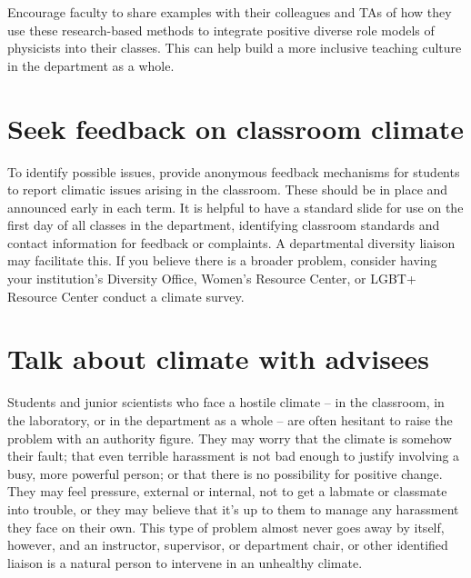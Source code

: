 Encourage faculty to share examples with their colleagues and TAs of how they use these research-based methods to integrate positive diverse role models of physicists into their classes. This can help build a more inclusive teaching culture in the department as a whole.

\section {Seek feedback on classroom climate}
\label{climate-feedback}
To identify possible issues, provide anonymous feedback mechanisms for students to report climatic issues arising in the classroom. These should be in place and announced early in each term. It is helpful to have a standard slide for use on the first day of all classes in the department, identifying classroom standards and contact information for feedback or complaints. A departmental diversity liaison may facilitate this. If you believe there is a broader problem, consider having your institution's Diversity Office, Women's Resource Center, or LGBT+ Resource Center conduct a climate survey.

\section {Talk about climate with advisees}
\label{talk-advisees}
Students and junior scientists who face a hostile climate -- in the classroom, in the laboratory, or in the department as a whole -- are often hesitant to raise the problem with an authority figure. They may worry that the climate is somehow their fault; that even terrible harassment is not bad enough to justify involving a busy, more powerful person; or that there is no possibility for positive change. They may feel pressure, external or internal, not to get a labmate or classmate into trouble, or they may believe that it's up to them to manage any harassment they face on their own. This type of problem almost never goes away by itself, however, and an instructor, supervisor, or department chair, or other identified liaison is a natural person to intervene in an unhealthy climate.

